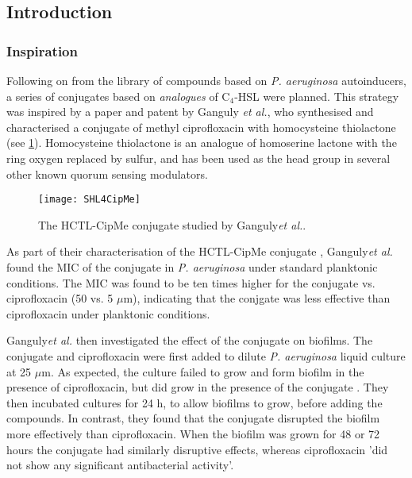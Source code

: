 \subsection{Introduction}

\subsubsection{Inspiration}

Following on from the library of compounds based on \textit{P. aeruginosa} autoinducers, a series of conjugates based on \textit{analogues} of C$_4$-HSL were planned. This strategy was inspired by a paper\cite{Ganguly2011} and patent\cite{Iyer2012} by Ganguly \textit{et al.}, who synthesised and characterised a conjugate  of methyl ciprofloxacin with homocysteine thiolactone (see \ref{fig:SHL4CipMe}). Homocysteine thiolactone is an analogue of homoserine lactone with the ring oxygen replaced by sulfur, and has been used as the head group in several other known quorum sensing modulators\cite{Eberhard1986,Schaefer1996,Passador1996,Smith2003,Chhabra1993,McInnis2011,Geske2007,Janssens2007}.

\begin{figure}[H]
	\begin{center}
		\texttt{[image: SHL4CipMe]}
		\caption{The HCTL-CipMe conjugate  studied by Ganguly\textit{et al.}\cite{Ganguly2011,Iyer2012}.\label{fig:SHL4CipMe}}
	\end{center}
\end{figure}


As part of their characterisation of the HCTL-CipMe conjugate , Ganguly\textit{et al.} found the MIC of the conjugate in \textit{P. aeruginosa} under standard planktonic conditions. 
The MIC was found to be ten times higher for the conjugate vs. ciprofloxacin (50 vs. 5 $\mu$m), indicating that the conjgate was less effective than ciprofloxacin under planktonic conditions. 

Ganguly\textit{et al.} then investigated the effect of the conjugate on biofilms. 
The conjugate and ciprofloxacin were first added to dilute \textit{P. aeruginosa} liquid culture at 25 $\mu$m. 
As expected, the culture failed to grow and form biofilm in the presence of ciprofloxacin, but did grow in the presence of the conjugate . 
They then incubated cultures for 24 h, to allow biofilms to grow, before adding the compounds. In contrast, they found that the conjugate  disrupted the biofilm more effectively than ciprofloxacin. 
When the biofilm was grown for 48 or 72 hours the conjugate had similarly disruptive effects, whereas ciprofloxacin 'did not show any significant antibacterial activity'.

